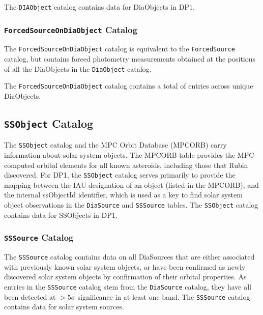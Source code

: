The \texttt{DIAObject} catalog contains data for \ndiaobjects DiaObjects in \gls{DP1}.

\subsubsection{\texttt{ForcedSourceOnDiaObject} Catalog}
%
The \texttt{ForcedSourceOnDiaObject} catalog \citep[][]{10.71929/rubin/2570321} is equivalent to the \texttt{ForcedSource} catalog, but contains \gls{forced photometry} measurements obtained at the positions of all the DiaObjects in the \texttt{DiaObject} catalog.

The \texttt{ForcedSourceOnDiaObject} catalog contains a total of \ndiaforcedsources entries across \ndiaforcedobjects unique DiaObjects.

\subsection{\texttt{SSObject} Catalog}
%
The \texttt{SSObject} catalog \citep[][]{10.71929/rubin/2570335} and the \gls{MPC} Orbit Database (MPCORB) carry information about solar system objects.
The MPCORB table provides the MPC-computed orbital elements for all known asteroids, including those that Rubin discovered.
For \gls{DP1}, the  \texttt{SSObject} catalog serves primarily to provide the mapping between the \gls{IAU} designation of an object (listed in the \gls{MPCORB}), and the internal ssObjectId identifier, which is used as a key to find solar system object observations in the \texttt{DiaSource} and \texttt{SSSource} tables.
The \texttt{SSObject} catalog contains data for \nssobjects SSObjects in \gls{DP1}.

\subsubsection{\texttt{SSSource} Catalog}
%
The \texttt{SSSource} catalog \citep[][]{10.71929/rubin/2570333} contains data on all DiaSources that are either associated with previously known solar system objects, or have been confirmed as newly discovered solar system objects by confirmation of their orbital properties.
As entries in the \texttt{SSSource} catalog stem from the \texttt{DiaSource} catalog, they have all been detected at $>5\sigma$ significance in at least one band.
The \texttt{SSSource} catalog contains data for \nsolarsystemsources solar system sources.

